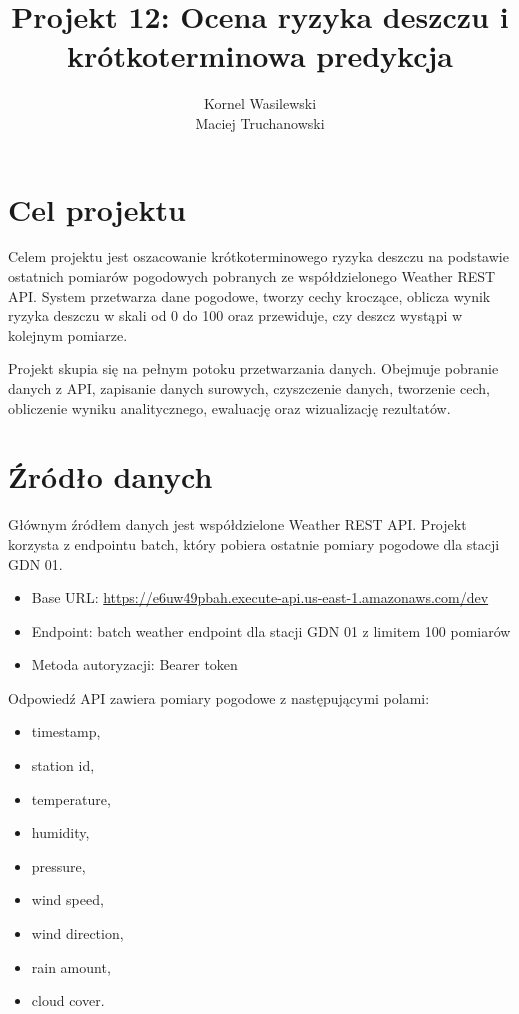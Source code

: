 \documentclass[12pt,a4paper]{article}
\title{Projekt 12: Ocena ryzyka deszczu i krótkoterminowa predykcja}
\author{Kornel Wasilewski\\Maciej Truchanowski}
\date{}
\begin{document}
\maketitle

\section{Cel projektu}

Celem projektu jest oszacowanie krótkoterminowego ryzyka deszczu na podstawie ostatnich pomiarów pogodowych pobranych ze współdzielonego Weather REST API. System przetwarza dane pogodowe, tworzy cechy kroczące, oblicza wynik ryzyka deszczu w skali od 0 do 100 oraz przewiduje, czy deszcz wystąpi w kolejnym pomiarze.

Projekt skupia się na pełnym potoku przetwarzania danych. Obejmuje pobranie danych z API, zapisanie danych surowych, czyszczenie danych, tworzenie cech, obliczenie wyniku analitycznego, ewaluację oraz wizualizację rezultatów.

\section{Źródło danych}

Głównym źródłem danych jest współdzielone Weather REST API. Projekt korzysta z endpointu batch, który pobiera ostatnie pomiary pogodowe dla stacji GDN 01.

\begin{itemize}
\item Base URL: \url{https://e6uw49pbah.execute-api.us-east-1.amazonaws.com/dev}
\item Endpoint: batch weather endpoint dla stacji GDN 01 z limitem 100 pomiarów
\item Metoda autoryzacji: Bearer token
\end{itemize}

Odpowiedź API zawiera pomiary pogodowe z następującymi polami:

\begin{itemize}
\item timestamp,
\item station id,
\item temperature,
\item humidity,
\item pressure,
\item wind speed,
\item wind direction,
\item rain amount,
\item cloud cover.
\end{itemize}
\end{document}
